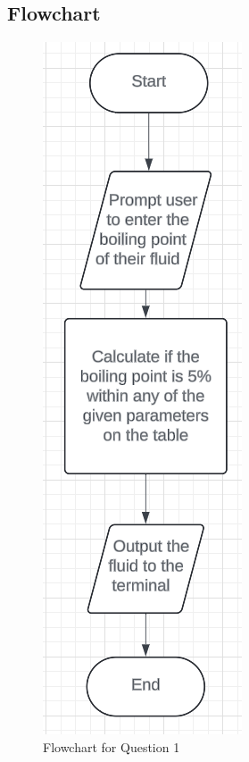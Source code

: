 \documentclass{article}
\begin{document}
\begin{flushleft}
  \section{Flowchart}
  \begin{figure}[!h]
    \begin{centering}
      \includegraphics[scale=1]{Q1_flowchart.png}
      \caption{Flowchart for Question 1}
    \end{centering}
  \end{figure}
  \newpage

\end{flushleft}
\end{document}
